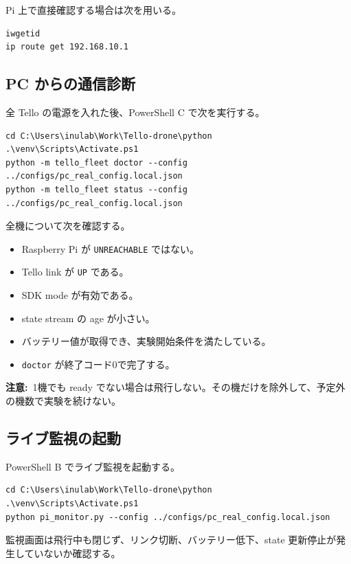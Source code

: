 \documentclass[11pt,a4paper]{ltjsarticle}
\newcommand{\code}[1]{\texttt{\small #1}}
\newcommand{\warning}[1]{\par\smallskip\noindent\textbf{注意:}~#1\par\smallskip}
\begin{document}
Pi 上で直接確認する場合は次を用いる。

\begin{lstlisting}
iwgetid
ip route get 192.168.10.1
\end{lstlisting}

\subsection{PC からの通信診断}

全 Tello の電源を入れた後、PowerShell C で次を実行する。

\begin{lstlisting}
cd C:\Users\inulab\Work\Tello-drone\python
.\venv\Scripts\Activate.ps1
python -m tello_fleet doctor --config ../configs/pc_real_config.local.json
python -m tello_fleet status --config ../configs/pc_real_config.local.json
\end{lstlisting}

全機について次を確認する。

\begin{itemize}[leftmargin=1.4em]
  \item Raspberry Pi が \code{UNREACHABLE} ではない。
  \item Tello link が \code{UP} である。
  \item SDK mode が有効である。
  \item state stream の age が小さい。
  \item バッテリー値が取得でき、実験開始条件を満たしている。
  \item \code{doctor} が終了コード0で完了する。
\end{itemize}

\warning{1機でも ready でない場合は飛行しない。その機だけを除外して、予定外の機数で実験を続けない。}

\subsection{ライブ監視の起動}

PowerShell B でライブ監視を起動する。

\begin{lstlisting}
cd C:\Users\inulab\Work\Tello-drone\python
.\venv\Scripts\Activate.ps1
python pi_monitor.py --config ../configs/pc_real_config.local.json
\end{lstlisting}

監視画面は飛行中も閉じず、リンク切断、バッテリー低下、state 更新停止が発生していないか確認する。
\end{document}
